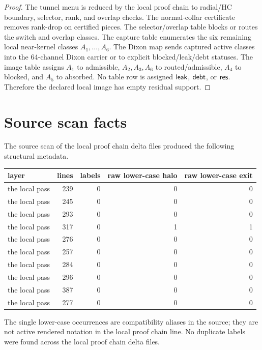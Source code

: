 \begin{proof}
The tunnel menu is reduced by the local proof chain to radial/HC boundary, selector,
rank, and overlap checks. The normal-collar certificate removes rank-drop
on certified pieces. The selector/overlap table blocks or routes the switch
and overlap classes. The capture table enumerates the six remaining local
near-kernel classes \(A_1,\ldots,A_6\). The Dixon map sends captured active
classes into the 64-channel Dixon carrier or to explicit blocked/leak/debt
statuses. The image table assigns \(A_1\) to admissible, \(A_2,A_3,A_6\)
to routed/admissible, \(A_4\) to blocked, and \(A_5\) to absorbed. No table row
is assigned \(\mathsf{leak}\), \(\mathsf{debt}\), or \(\mathsf{res}\). Therefore the declared local image
has empty residual support.
\end{proof}

\section{Source scan facts}

The source scan of the local proof chain delta files produced the following structural
metadata.

\begin{center}\small
\begin{tabular}{lrrrr}
\toprule
layer & lines & labels & raw lower-case halo & raw lower-case exit\\
\midrule
the local pass & 239 & 0 & 0 & 0\\
the local pass & 245 & 0 & 0 & 0\\
the local pass & 293 & 0 & 0 & 0\\
the local pass & 317 & 0 & 1 & 1\\
the local pass & 276 & 0 & 0 & 0\\
the local pass & 257 & 0 & 0 & 0\\
the local pass & 284 & 0 & 0 & 0\\
the local pass & 296 & 0 & 0 & 0\\
the local pass & 387 & 0 & 0 & 0\\
the local pass & 277 & 0 & 0 & 0\\
\bottomrule
\end{tabular}
\end{center}

The single lower-case occurrences are compatibility aliases in the source;
they are not active rendered notation in the local proof chain line. No duplicate labels
were found across the local proof chain delta files.

